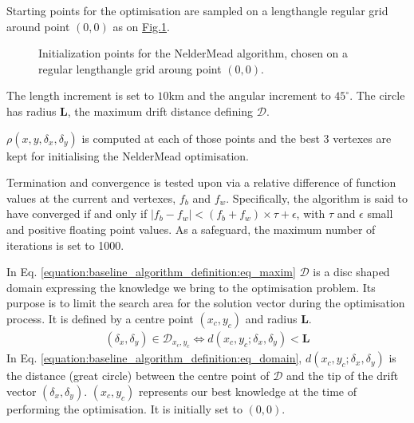\documentclass[letterpaper,10pt,english]{jupyterBook}
\begin{document}
\sphinxAtStartPar
Starting points for the optimisation are sampled on a length\sphinxhyphen{}angle regular grid around point \((0,0)\) as on \hyperref[\detokenize{baseline_algorithm_definition:fig-startpoints}]{Fig.\@ \ref{\detokenize{baseline_algorithm_definition:fig-startpoints}}}.

\begin{figure}[htbp]
\centering
\capstart

\noindent{}
\caption{Initialization points for the Nelder\sphinxhyphen{}Mead algorithm, chosen on a regular length\sphinxhyphen{}angle grid aroung point \((0,0)\).}\label{\detokenize{baseline_algorithm_definition:fig-startpoints}}\end{figure}

\sphinxAtStartPar
The length increment is set to \(10\)km and the angular increment to
\(45^{\circ}\). The circle has radius \(\mathbf{L}\), the maximum drift
distance defining \(\mathcal{D}\).

\sphinxAtStartPar
\(\rho(x,y,\delta_x,\delta_y)\) is computed at each of those points and the best 3 vertexes are kept for initialising the Nelder\sphinxhyphen{}Mead
optimisation.

\sphinxAtStartPar
Termination and convergence is tested upon via a relative difference of function values at the current  and  vertexes, \(f_b\) and
\(f_w\). Specifically, the algorithm is said to have converged if and only if \(| f_b - f_w | < (f_b + f_w) \times \tau + \epsilon\), with \(\tau\) and
\(\epsilon\) small and positive floating point values. As a safeguard, the maximum number of iterations is set to 1000.

\sphinxAtStartPar
In Eq. \eqref{equation:baseline_algorithm_definition:eq_maxim} \(\mathcal{D}\) is a disc shaped domain expressing the 
knowledge we bring to the optimisation problem. Its purpose is to limit
the search area for the solution vector during the optimisation process. It is defined by a centre point \((x_c,y_c)\) and radius \(\mathbf{L}\).
\begin{equation}\label{equation:baseline_algorithm_definition:eq_domain}
\begin{split}
(\delta_x,\delta_y) \in \mathcal{D}_{x_c,y_c} \Leftrightarrow d(x_c,y_c;\delta_x,\delta_y) < \mathbf{L}
\end{split}
\end{equation}
\sphinxAtStartPar
In Eq. \eqref{equation:baseline_algorithm_definition:eq_domain}, \(d(x_c,y_c;\delta_x,\delta_y)\) is the distance
(great circle) between the centre point of \(\mathcal{D}\) and
the tip of the drift vector \((\delta_x,\delta_y)\). \((x_c,y_c)\)
represents our best  knowledge at the time of performing the
optimisation. It is initially set to \((0,0)\).
\end{document}
